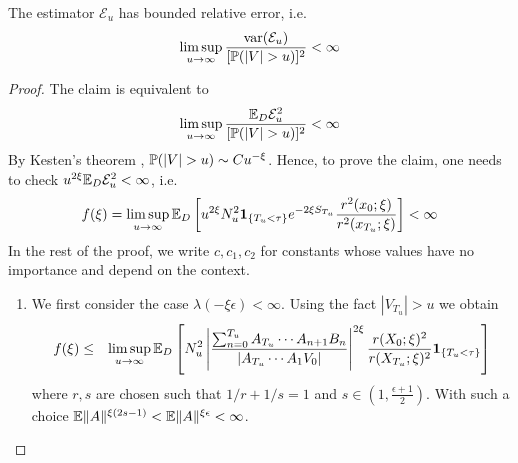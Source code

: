 \documentclass{article}
\begin{document}
\begin{theorem}
  The estimator $\mathcal E_u$ has bounded relative error, i.e.
  \begin{equation*}
    \limsup_{u \to \infty} {\var(\mathcal E_u) \over [\P(|V| > u)]^2} < \infty
  \end{equation*}
\end{theorem}
\begin{proof}
  The claim is equivalent to
  \[
  \limsup_{u \to \infty} {\E_D \mathcal E_u^2 \over [\P(|V| > u)]^2} < \infty
  \]
  By Kesten's theorem \cite{Kesten1973}, $\P(|V| > u) \sim C
  u^{-\xi}$. Hence, to prove the claim, one needs to check
  $u^{2\xi}\E_D \mathcal E_u^2 < \infty$, i.e.
  \[
  f(\xi) = \limsup_{u \to \infty} \E_D  \left[u^{2\xi}
    N_u^2 \1{T_u < \tau} e^{-2\xi S_{T_u}} {r^2(x_0; \xi)
      \over r^2(x_{T_u}; \xi)}\right]
  < \infty
  \]
  In the rest of the proof, we write $c, c_1, c_2$ for constants whose values
  have no importance and depend on the context.
  \begin{enumerate}
  \item We first consider the case $\lambda(-\xi\epsilon) <
    \infty$. Using the fact $|V_{T_u}| > u$  we obtain
    \begin{eqnarray*}
      f(\xi) &\leq& \limsup_{u \to \infty} \E_D \left[
        N_u^2  \left|
          \frac{
            \sum_{n=0}^{T_u} A_{T_u} \cdots A_{n+1} B_n 
          }{
            |A_{T_u} \cdots A_1 V_0|
          }
        \right|^{2 \xi}
        \frac{
          r(X_0; \xi)^2
        }{
          r(X_{T_u}; \xi)^2
        } \1{T_u < \tau}
      \right] \\
    \end{eqnarray*}
    where $r, s$ are chosen such that $1/r + 1/s = 1$ and $s \in (1,
    \frac{\epsilon + 1}{2})$. With such a choice $\E \|A\|^{\xi(2s -
      1)} < \E \|A\|^{\xi \epsilon} < \infty$.



\end{enumerate}
\end{proof}
\end{document}

